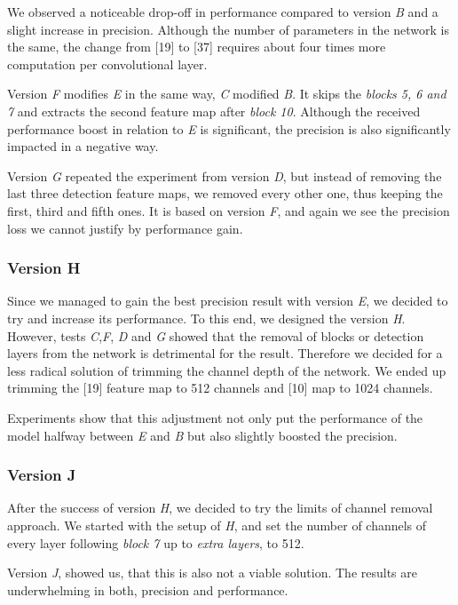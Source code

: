 We observed a noticeable drop-off in performance compared to version \textit{B} and a slight increase in precision. Although the number of parameters in the network is the same, the change from [19] to [37] requires about four times more computation per convolutional layer.

Version \textit{F} modifies \textit{E} in the same way, \textit{C} modified \textit{B}. It skips the \textit{blocks 5, 6 and 7} and extracts the second feature map after \textit{block 10}. Although the received performance boost in relation to \textit{E} is significant, the precision is also significantly impacted in a negative way.

Version \textit{G} repeated the experiment from version \textit{D}, but instead of removing the last three detection feature maps, we removed every other one, thus keeping the first, third and fifth ones. It is based on version \textit{F}, and again we see the precision loss we cannot justify by performance gain.

\subsubsection{Version H}
Since we managed to gain the best precision result with version \textit{E}, we decided to try and increase its performance. To this end, we designed the version \textit{H}. However, tests \textit{C},\textit{F}, \textit{D} and \textit{G} showed that the removal of blocks or detection layers from the network is detrimental for the result. Therefore we decided for a less radical solution of trimming the channel depth of the network. We ended up trimming the [19] feature map to 512 channels and [10] map to 1024 channels.

Experiments show that this adjustment not only put the performance of the model halfway between \textit{E} and \textit{B} but also slightly boosted the precision.

\subsubsection{Version J}
After the success of version \textit{H}, we decided to try the limits of channel removal approach. We started with the setup of \textit{H}, and set the number of channels of every layer following \textit{block 7} up to \textit{extra layers}, to 512. 

Version \textit{J}, showed us, that this is also not a viable solution. The results are underwhelming in both, precision and performance.


